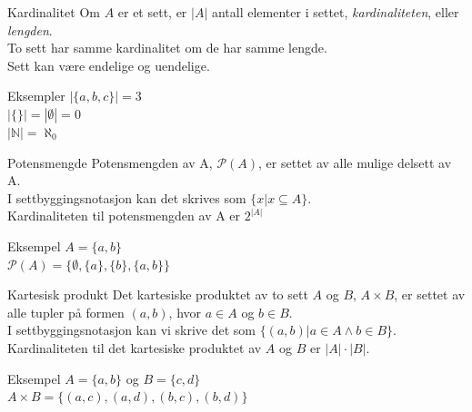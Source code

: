 \begin{frame}{Kardinalitet}
    Om $A$ er et sett, er $|A|$ antall elementer i settet, \textit{kardinaliteten}, eller \textit{lengden}.\\
    To sett har samme kardinalitet om de har samme lengde.\\
    Sett kan være endelige og uendelige.
    \begin{block}{Eksempler}
        $|\{a, b, c\}| = 3$ \\
        $|\{\}| = |\emptyset| = 0$\\
        $|\mathbb{N}| = \aleph_0$
    \end{block}
\end{frame}

\begin{frame}{Potensmengde}
    Potensmengden av A, $\mathcal{P}(A)$, er settet av alle mulige delsett av A. \\
    I settbyggingsnotasjon kan det skrives som $\{x | x \subseteq A\}$. \\
    Kardinaliteten til potensmengden av A er $2^{|A|}$ \\
    \begin{block}{Eksempel}
        $A = \{a, b\}$ \\
        $\mathcal{P}(A) = \{\emptyset, \{a\}, \{b\}, \{a, b\}\}$
    \end{block}
\end{frame}

\begin{frame}{Kartesisk produkt}
    Det kartesiske produktet av to sett $A$ og $B$, $A \times B$, er settet av alle tupler på formen $(a,b)$, hvor $a \in A$ og $b \in B$. \\
    I settbyggingsnotasjon kan vi skrive det som $\{(a,b) | a \in A \land b \in B\}$. \\
    Kardinaliteten til det kartesiske produktet av $A$ og $B$ er $|A| \cdot |B|$. \\
    \begin{block}{Eksempel}
        $A = \{a, b\}$ og $B = \{c, d\}$\\
        $A \times B = \{(a, c), (a, d), (b, c), (b, d)\}$
    \end{block}
\end{frame}